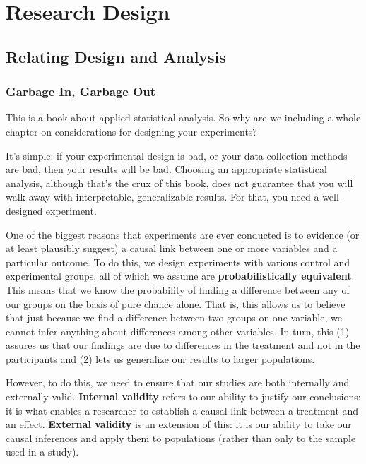 
\chapter[Research Design]{Research Design}
\section{Relating Design and Analysis}

\subsection{Garbage In, Garbage Out}
This is a book about applied statistical analysis. So why are we including a whole chapter on considerations for designing your experiments?

It's simple: if your experimental design is bad, or your data collection methods are bad, then your results will be bad. Choosing an appropriate statistical analysis, although that's the crux of this book, does not guarantee that you will walk away with interpretable, generalizable results. For that, you need a well-designed experiment.

One of the biggest reasons that experiments are ever conducted is to evidence (or at least plausibly suggest) a causal link between one or more variables and a particular outcome. To do this, we design experiments with various control and experimental groups, all of which we assume are \textbf{probabilistically equivalent}. This means that we know the probability of finding a difference between any of our groups on the basis of pure chance alone. That is, this allows us to believe that just because we find a difference between two groups on one variable, we cannot infer anything about differences among other variables. In turn, this (1) assures us that our findings are due to differences in the treatment and not in the participants and (2) lets us generalize our results to larger populations.

However, to do this, we need to ensure that our studies are both internally and externally valid. \textbf{Internal validity} refers to our ability to justify our conclusions: it is what enables a researcher to establish a causal link between a treatment and an effect. \textbf{External validity} is an extension of this: it is our ability to take our causal inferences and apply them to populations (rather than only to the sample used in a study).

